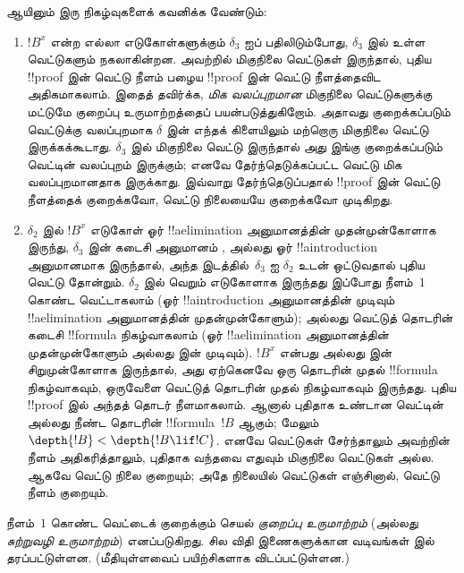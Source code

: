 \documentclass[../../../include/open-logic-section]{subfiles}
\begin{document}
ஆயினும் இரு நிகழ்வுகளைக் கவனிக்க வேண்டும்:
\begin{enumerate}
  \item $!B^x$ என்ற எல்லா எடுகோள்களுக்கும்
  $\delta_3$ ஐப் பதிலிடும்போது, $\delta_3$ இல் உள்ள
  வெட்டுகளும் நகலாகின்றன. அவற்றில் மிகுநிலை
  வெட்டுகள் இருந்தால், புதிய !!{proof} இன் வெட்டு
  நீளம் பழைய !!{proof} இன் வெட்டு நீளத்தைவிட
  அதிகமாகலாம்.
  இதைத் தவிர்க்க, \emph{மிக வலப்புறமான} மிகுநிலை
  வெட்டுகளுக்கு மட்டுமே குறைப்பு உருமாற்றத்தைப்
  பயன்படுத்துகிறோம். அதாவது குறைக்கப்படும் வெட்டுக்கு
  வலப்புறமாக $\delta$ இன் எந்தக் கிளையிலும் மற்றொரு
  மிகுநிலை வெட்டு இருக்கக்கூடாது. $\delta_3$ இல்
  மிகுநிலை வெட்டு இருந்தால் அது இங்கு குறைக்கப்படும்
  வெட்டின் வலப்புறம் இருக்கும்; எனவே தேர்ந்தெடுக்கப்பட்ட
  வெட்டு மிக வலப்புறமானதாக இருக்காது. இவ்வாறு
  தேர்ந்தெடுப்பதால் !!{proof} இன் வெட்டு நீளத்தைக்
  குறைக்கவோ, வெட்டு நிலையையே குறைக்கவோ முடிகிறது.
  \item $\delta_2$ இல் $!B^x$ எடுகோள் ஓர்
  !!a{elimination} அனுமானத்தின் முதன்முன்கோளாக
  இருந்து, $\delta_3$ இன் கடைசி அனுமானம்
  \Elim{\lor}, \Elim{\lexists} அல்லது ஓர்
  !!a{introduction} அனுமானமாக இருந்தால்,
  அந்த இடத்தில்~$\delta_3$ ஐ $\delta_2$ உடன்
  ஒட்டுவதால் புதிய வெட்டு தோன்றும். $\delta_2$
  இல் வெறும் எடுகோளாக இருந்தது இப்போது
  நீளம்~$1$ கொண்ட வெட்டாகலாம் (ஓர்
  !!a{introduction} அனுமானத்தின் முடிவும்
  !!a{elimination} அனுமானத்தின் முதன்முன்கோளும்);
  அல்லது வெட்டுத் தொடரின் கடைசி !!{formula}
  நிகழ்வாகலாம் (ஓர் !!a{elimination} அனுமானத்தின்
  முதன்முன்கோளும் \Elim{\lor} அல்லது
  \Elim{\lexists} இன் முடிவும்). $!B^x$ என்பது
  \Elim{\lor} அல்லது \Elim{\lexists} இன்
  சிறுமுன்கோளாக இருந்தால், அது ஏற்கெனவே ஒரு
  தொடரின் முதல் !!{formula} நிகழ்வாகவும்,
  ஒருவேளை வெட்டுத் தொடரின் முதல் நிகழ்வாகவும்
  இருந்தது. புதிய !!{proof} இல் அந்தத் தொடர்
  நீளமாகலாம். ஆனால் புதிதாக உண்டான வெட்டின்
  அல்லது நீண்ட தொடரின் !!{formula}~$!B$ ஆகும்;
  மேலும் $\depth{!B} < \depth{!B \lif !C}$.
  எனவே வெட்டுகள் சேர்ந்தாலும் அவற்றின் நீளம்
  அதிகரித்தாலும், புதிதாக வந்தவை எதுவும்
  மிகுநிலை வெட்டுகள் அல்ல. ஆகவே வெட்டு நிலை
  குறையும்; அதே நிலையில் வெட்டுகள் எஞ்சினால்,
  வெட்டு நீளம் குறையும்.
\end{enumerate}

நீளம்~$1$ கொண்ட வெட்டைக் குறைக்கும் செயல்
\emph{குறைப்பு உருமாற்றம்} (அல்லது
\emph{சுற்றுவழி உருமாற்றம்}) எனப்படுகிறது.
சில விதி இணைகளுக்கான வடிவங்கள்
 இல் தரப்பட்டுள்ளன.
(மீதியுள்ளவைப் பயிற்சிகளாக விடப்பட்டுள்ளன.)
\end{document}
